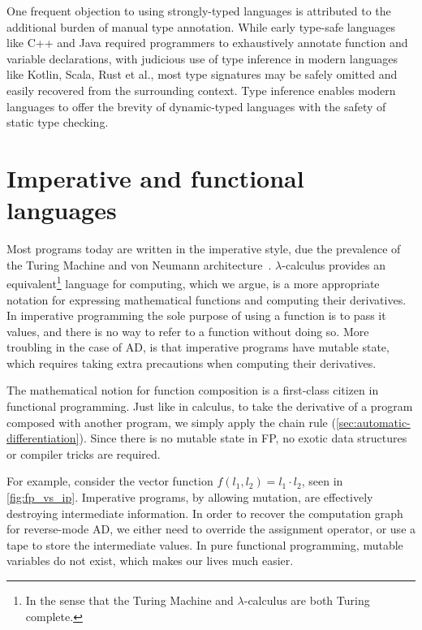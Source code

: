 \documentclass[12pt,initial,twoside,maitrise]{dms}
\numberwithin{equation}{section}
\numberwithin{table}{chapter}
\numberwithin{figure}{chapter}
\begin{document}
One frequent objection to using strongly-typed languages is attributed to the additional burden of manual type annotation. While early type-safe languages like C++ and Java required programmers to exhaustively annotate function and variable declarations, with judicious use of type inference in modern languages like Kotlin, Scala, Rust et al., most type signatures may be safely omitted and easily recovered from the surrounding context. Type inference enables modern languages to offer the brevity of dynamic-typed languages with the safety of static type checking.

\section{Imperative and functional languages}

Most programs today are written in the imperative style, due the prevalence of the Turing Machine and von Neumann architecture~\citep{backus2007can}. $\lambda$-calculus provides an equivalent\footnote{In the sense that the Turing Machine and $\lambda$-calculus are both Turing complete.} language for computing, which we argue, is a more appropriate notation for expressing mathematical functions and computing their derivatives. In imperative programming the sole purpose of using a function is to pass it values, and there is no way to refer to a function without doing so. More troubling in the case of AD, is that imperative programs have mutable state, which requires taking extra precautions when computing their derivatives.

The mathematical notion for function composition is a first-class citizen in functional programming. Just like in calculus, to take the derivative of a program composed with another program, we simply apply the chain rule (\autoref{sec:automatic-differentiation}). Since there is no mutable state in FP, no exotic data structures or compiler tricks are required.

For example, consider the vector function $f(l_1, l_2) = l_1 \cdot l_2$, seen in \autoref{fig:fp_vs_ip}. Imperative programs, by allowing mutation, are effectively destroying intermediate information. In order to recover the computation graph for reverse-mode AD, we either need to override the assignment operator, or use a tape to store the intermediate values. In pure functional programming, mutable variables do not exist, which makes our lives much easier.
\end{document}

